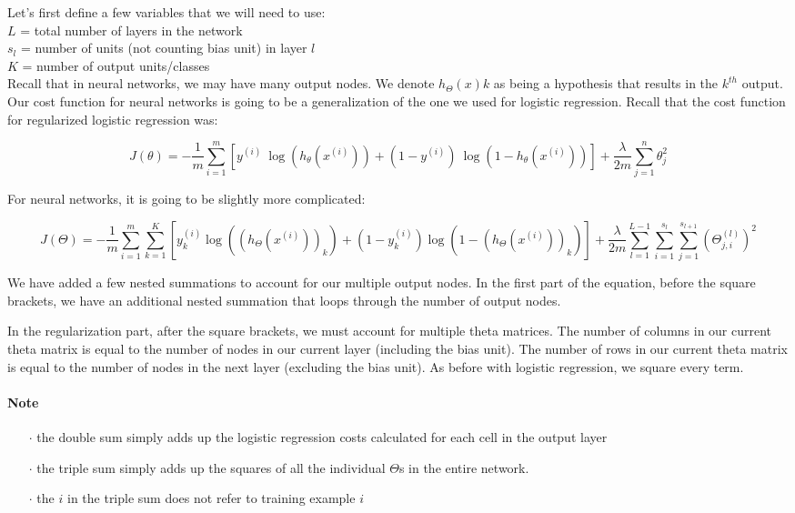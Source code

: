 \documentclass[UTF8]{article}
\begin{document}
Let's first define a few variables that we will need to use:
\\
$L$ = total number of layers in the network
\\
$s_l$ = number of units (not counting bias unit) in layer $l$
\\
$K$ = number of output units/classes
\\
Recall that in neural networks, we may have many output nodes. We denote $h_\Theta(x)k$ as being a hypothesis that results in the $k^{th}$ output. Our cost function for neural networks is going to be a generalization of the one we used for logistic regression. Recall that the cost function for regularized logistic regression was:

\[J(\theta) = - \frac{1}{m} \sum_{i=1}^m [ y^{(i)}\ \log (h_\theta (x^{(i)})) + (1 - y^{(i)})\ \log (1 - h_\theta(x^{(i)}))] + \frac{\lambda}{2m}\sum_{j=1}^n \theta_j^2\]

For neural networks, it is going to be slightly more complicated:

\[J(\Theta) = - \frac{1}{m} \sum_{i=1}^m \sum_{k=1}^K \left[y^{(i)}_k \log ((h_\Theta (x^{(i)}))_k) + (1 - y^{(i)}_k)\log (1 - (h_\Theta(x^{(i)}))_k)\right] + \frac{\lambda}{2m}\sum_{l=1}^{L-1} \sum_{i=1}^{s_l} \sum_{j=1}^{s_{l+1}} ( \Theta_{j,i}^{(l)})^2\]

We have added a few nested summations to account for our multiple output nodes. In the first part of the equation, before the square brackets, we have an additional nested summation that loops through the number of output nodes.

In the regularization part, after the square brackets, we must account for multiple theta matrices. The number of columns in our current theta matrix is equal to the number of nodes in our current layer (including the bias unit). The number of rows in our current theta matrix is equal to the number of nodes in the next layer (excluding the bias unit). As before with logistic regression, we square every term.

\paragraph{Note}

\begin{itemize}
\item[$\cdot$]the double sum simply adds up the logistic regression costs calculated for each cell in the output layer
\item[$\cdot$]the triple sum simply adds up the squares of all the individual $\Theta$s in the entire network.
\item[$\cdot$]the $i$ in the triple sum does not refer to training example $i$
\end{itemize}
\end{document}
